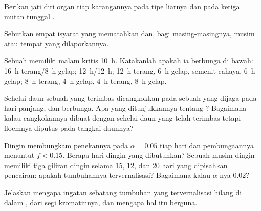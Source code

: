 \begin{exercise}[$\star$]\label{exo:b2:plant-flowering:3}
Berikan jati diri organ tiap karangannya pada tipe liarnya dan pada
ketiga mutan tunggal .
\end{exercise}

\begin{exercise}[$\star$]\label{exo:b2:plant-flowering:4}
Sebutkan empat isyarat yang mematahkan   dan, bagi
masing-masingnya, musim atau tempat yang dilaporkannya.
\end{exercise}

\begin{exercise}[$\star\star$]\label{exo:b2:plant-flowering:5}
Sebuah  memiliki malam kritis \qty{10}{h}.
Katakanlah apakah ia berbunga di bawah: \qty{16}{h} terang/\qty{8}{h} gelap;
\qty{12}{h}/\qty{12}{h}; \qty{12}{h} terang, \qty{6}{h} gelap, semenit
cahaya, \qty{6}{h} gelap; \qty{8}{h} terang, \qty{4}{h} gelap,
\qty{4}{h} terang, \qty{8}{h} gelap.
\end{exercise}

\begin{exercise}[$\star\star$]\label{exo:b2:plant-flowering:6}
Sehelai daun sebuah  yang terimbas dicangkokkan
pada sebuah  yang dijaga pada hari panjang, dan
 berbunga. Apa yang ditunjukkannya tentang
? Bagaimana kalau cangkokannya dibuat dengan sehelai daun yang
telah terimbas tetapi floemnya diputus pada tangkai daunnya?
\end{exercise}

\begin{exercise}[$\star\star$]\label{exo:b2:plant-flowering:7}
Dingin membungkam penekannya pada $\alpha = 0.05$ tiap hari dan
pembungaannya menuntut $f < 0.15$. Berapa hari dingin yang dibutuhkan?
Sebuah musim dingin memiliki tiga giliran dingin selama 15, 12, dan 20
hari yang dipisahkan pencairan: apakah tumbuhannya tervernalisasi?
Bagaimana kalau $\alpha$-nya $0.02$?
\end{exercise}

\begin{exercise}[$\star\star$]\label{exo:b2:plant-flowering:8}
Jelaskan mengapa ingatan sebatang tumbuhan yang tervernalisasi hilang
di dalam , dari segi kromatinnya, dan mengapa hal itu berguna.
\end{exercise}

